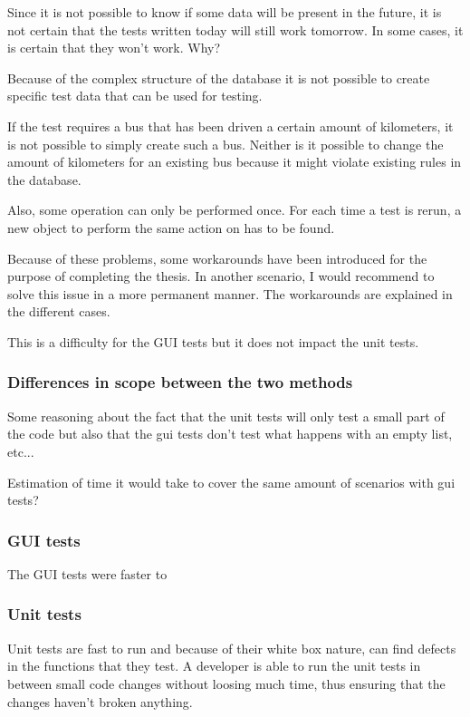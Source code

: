 \documentclass{article}
\begin{document}
			Since it is not possible to know if some data will be present in the future, it is not certain that the tests written today will still work tomorrow. In some cases, it is certain that they won't work. Why?

			Because of the complex structure of the database it is not possible to create specific test data that can be used for testing.

			If the test requires a bus that has been driven a certain amount of kilometers, it is not possible to simply create such a bus. Neither is it possible to change the amount of kilometers for an existing bus because it might violate existing rules in the database. 

			Also, some operation can only be performed once. For each time a test is rerun, a new object to perform the same action on has to be found.

			Because of these problems, some workarounds have been introduced for the purpose of completing the thesis. In another scenario, I would recommend to solve this issue in a more permanent manner. The workarounds are explained in the different cases.

			This is a difficulty for the GUI tests but it does not impact the unit tests.

			\subsubsection{Differences in scope between the two methods}
			Some reasoning about the fact that the unit tests will only test a small part of the code but also that the gui tests don't test what happens with an empty list, etc...

			Estimation of time it would take to cover the same amount of scenarios with gui tests?

			\subsubsection{GUI tests}
			The GUI tests were faster to 

			\subsubsection{Unit tests}
			Unit tests are fast to run and because of their white box nature, can find defects in the functions that they test. A developer is able to run the unit tests in between small code changes without loosing much time, thus ensuring that the changes haven't broken anything. 
\end{document}
